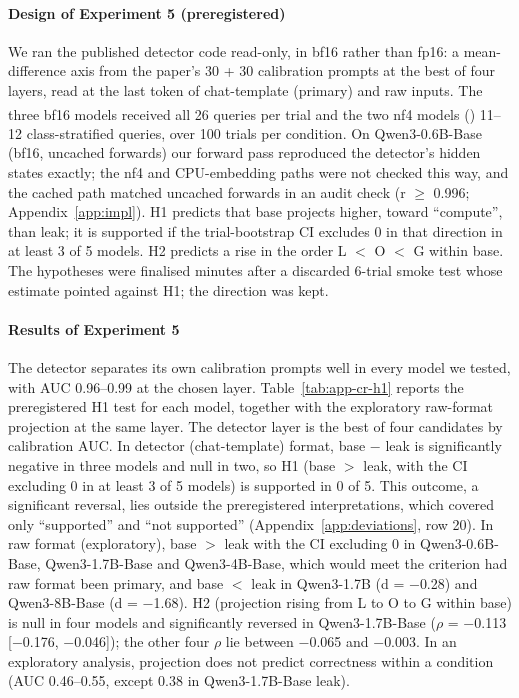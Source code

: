 \documentclass[11pt]{article}
\begin{document}
\paragraph{Design of Experiment 5 (preregistered)}

We ran the published detector code read-only, in bf16 rather than fp16: a mean-difference axis from the paper's 30 + 30 calibration prompts at the best of four layers, read at the last token of chat-template (primary) and raw inputs. The three bf16 models received all 26 queries per trial and the two nf4 models (\textsuperscript{\dag}) 11--12 class-stratified queries, over 100 trials per condition. On Qwen3-0.6B-Base (bf16, uncached forwards) our forward pass reproduced the detector's hidden states exactly; the nf4 and CPU-embedding paths were not checked this way, and the cached path matched uncached forwards in an audit check (r $\geq$ 0.996; Appendix~\ref{app:impl}). H1 predicts that base projects higher, toward ``compute'', than leak; it is supported if the trial-bootstrap CI excludes 0 in that direction in at least 3 of 5 models. H2 predicts a rise in the order L $<$ O $<$ G within base. The hypotheses were finalised minutes after a discarded 6-trial smoke test whose estimate pointed against H1; the direction was kept.

\paragraph{Results of Experiment 5}

The detector separates its own calibration prompts well in every model we tested, with AUC 0.96--0.99 at the chosen layer. Table~\ref{tab:app-cr-h1} reports the preregistered H1 test for each model, together with the exploratory raw-format projection at the same layer. The detector layer is the best of four candidates by calibration AUC. In detector (chat-template) format, base $-$ leak is significantly negative in three models and null in two, so H1 (base $>$ leak, with the CI excluding 0 in at least 3 of 5 models) is supported in 0 of 5. This outcome, a significant reversal, lies outside the preregistered interpretations, which covered only ``supported'' and ``not supported'' (Appendix~\ref{app:deviations}, row 20). In raw format (exploratory), base $>$ leak with the CI excluding 0 in Qwen3-0.6B-Base, Qwen3-1.7B-Base and Qwen3-4B-Base, which would meet the criterion had raw format been primary, and base $<$ leak in Qwen3-1.7B (d = $-$0.28) and Qwen3-8B-Base (d = $-$1.68). H2 (projection rising from L to O to G within base) is null in four models and significantly reversed in Qwen3-1.7B-Base ($\rho$ = $-$0.113 [$-$0.176, $-$0.046]); the other four $\rho$ lie between $-$0.065 and $-$0.003. In an exploratory analysis, projection does not predict correctness within a condition (AUC 0.46--0.55, except 0.38 in Qwen3-1.7B-Base leak).
\end{document}
